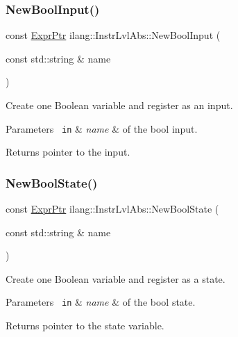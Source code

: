 \subsubsection{\texorpdfstring{New\+Bool\+Input()}{NewBoolInput()}}
{\footnotesize\ttfamily const \mbox{\hyperlink{namespaceilang_a7c4196c72e53ea4df4b7861af7bc3bce}{Expr\+Ptr}} ilang\+::\+Instr\+Lvl\+Abs\+::\+New\+Bool\+Input (\begin{DoxyParamCaption}\item[{const std\+::string \&}]{name }\end{DoxyParamCaption})}



Create one Boolean variable and register as an input. 


\begin{DoxyParams}[1]{Parameters}
\mbox{\texttt{ in}}  & {\em name} & of the bool input. \\
\hline
\end{DoxyParams}
\begin{DoxyReturn}{Returns}
pointer to the input. 
\end{DoxyReturn}
\mbox{\label{classilang_1_1_instr_lvl_abs_a7ccfca0eb52e4700f4e28a29df37ea47}} 
\subsubsection{\texorpdfstring{New\+Bool\+State()}{NewBoolState()}}
{\footnotesize\ttfamily const \mbox{\hyperlink{namespaceilang_a7c4196c72e53ea4df4b7861af7bc3bce}{Expr\+Ptr}} ilang\+::\+Instr\+Lvl\+Abs\+::\+New\+Bool\+State (\begin{DoxyParamCaption}\item[{const std\+::string \&}]{name }\end{DoxyParamCaption})}



Create one Boolean variable and register as a state. 


\begin{DoxyParams}[1]{Parameters}
\mbox{\texttt{ in}}  & {\em name} & of the bool state. \\
\hline
\end{DoxyParams}
\begin{DoxyReturn}{Returns}
pointer to the state variable. 
\end{DoxyReturn}
\mbox{\label{classilang_1_1_instr_lvl_abs_af2bc2d00955d5ce5322abeddb4d8324f}} 
